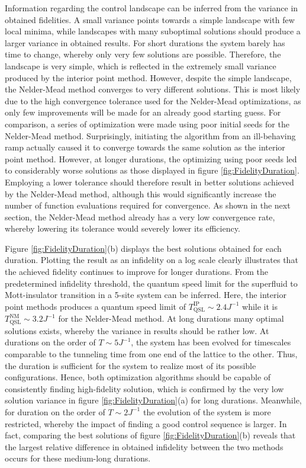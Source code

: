 Information regarding the control landscape can be inferred from the variance in obtained fidelities. A small variance points towards a simple landscape with few local minima, while landscapes with many suboptimal solutions should produce a larger variance in obtained results. For short durations the system barely has time to change, whereby only very few solutions are possible. Therefore, the landscape is very simple, which is reflected in the extremely small variance produced by the interior point method. However, despite the simple landscape, the Nelder-Mead method converges to very different solutions. This is most likely due to the high convergence tolerance used for the Nelder-Mead optimizations, as only few improvements will be made for an already good starting guess. For comparison, a series of optimization were made using poor initial seeds for the Nelder-Mead method. Surprisingly, initiating the algorithm from an ill-behaving ramp actually caused it to converge towards the same solution as the interior point method. However, at longer durations, the optimizing using poor seeds led to considerably worse solutions as those displayed in figure \ref{fig:FidelityDuration}. Employing a lower tolerance should therefore result in better solutions achieved by the Nelder-Mead method, although this would significantly increase the number of function evaluations required for convergence. As shown in the next section, the Nelder-Mead method already has a very low convergence rate, whereby lowering its tolerance would severely lower its efficiency.

Figure \ref{fig:FidelityDuration}(b) displays the best solutions obtained for each duration. Plotting the result as an infidelity on a log scale clearly illustrates that the achieved fidelity continues to improve for longer durations. From the predetermined infidelity threshold, the quantum speed limit for the superfluid to Mott-insulator transition in a 5-site system can be inferred. Here, the interior point methods produces a quantum speed limit of $T_{\mathrm{QSL}}^{\mathrm{IP}} \sim 2.4 J^{-1}$ while it is $T_{\mathrm{QSL}}^{\mathrm{NM}} \sim 3.2 J^{-1}$ for the Nelder-Mead method. 
At long durations many optimal solutions exists, whereby the variance in results should be rather low. At durations on the order of $T \sim 5 J^{-1}$, the system has been evolved for timescales comparable to the tunneling time from one end of the lattice to the other. Thus, the duration is sufficient for the system to realize most of its possible configurations. Hence, both optimization algorithms should be capable of consistently finding high-fidelity solution, which is confirmed by the very low solution variance in figure \ref{fig:FidelityDuration}(a) for long durations. Meanwhile, for duration on the order of $T \sim 2 J^{-1}$  the evolution of the system is more restricted, whereby the impact of finding a good control sequence is larger. In fact, comparing the best solutions of figure \ref{fig:FidelityDuration}(b) reveals that the largest relative difference in obtained infidelity between the two methods occurs for these medium-long durations.\\

